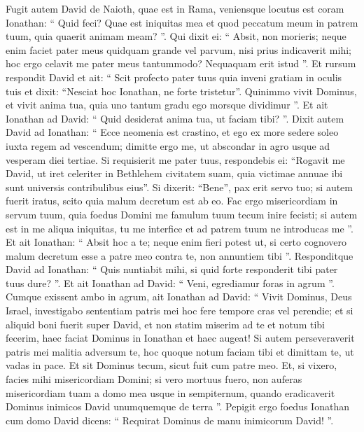 \begin{biblechapter}
\begin{biblechapter}
\begin{biblechapter}
\begin{biblechapter}
\begin{biblechapter}
\begin{biblechapter}
\begin{biblechapter}
\begin{biblechapter}
\begin{biblechapter}
\begin{biblechapter}
\begin{biblechapter}
\begin{biblechapter}
\begin{biblechapter}
\begin{biblechapter}
\begin{biblechapter}
\begin{biblechapter}
\begin{biblechapter}
\begin{biblechapter}
\begin{biblechapter}
\begin{biblechapter}
\verse Fugit autem David de Naioth, quae est in Rama, veniensque locutus est coram Ionathan: “ Quid feci? Quae est iniquitas mea et quod peccatum meum in patrem tuum, quia quaerit animam meam? ”. 
\verse Qui dixit ei: “ Absit, non morieris; neque enim faciet pater meus quidquam grande vel parvum, nisi prius indicaverit mihi; hoc ergo celavit me pater meus tantummodo? Nequaquam erit istud ”. 
\verse Et rursum respondit David et ait: “ Scit profecto pater tuus quia inveni gratiam in oculis tuis et dixit: “Nesciat hoc Ionathan, ne forte tristetur”. Quinimmo vivit Dominus, et vivit anima tua, quia uno tantum gradu ego morsque dividimur ”.
 \verse Et ait Ionathan ad David: “ Quid desiderat anima tua, ut faciam tibi? ”. 
\verse Dixit autem David ad Ionathan: “ Ecce neomenia est crastino, et ego ex more sedere soleo iuxta regem ad vescendum; dimitte ergo me, ut abscondar in agro usque ad vesperam diei tertiae. 
\verse Si requisierit me pater tuus, respondebis ei: “Rogavit me David, ut iret celeriter in Bethlehem civitatem suam, quia victimae annuae ibi sunt universis contribulibus eius”. 
\verse Si dixerit: “Bene”, pax erit servo tuo; si autem fuerit iratus, scito quia malum decretum est ab eo. 
\verse Fac ergo misericordiam in servum tuum, quia foedus Domini me famulum tuum tecum inire fecisti; si autem est in me aliqua iniquitas, tu me interfice et ad patrem tuum ne introducas me ”. 
\verse Et ait Ionathan: “ Absit hoc a te; neque enim fieri potest ut, si certo cognovero malum decretum esse a patre meo contra te, non annuntiem tibi ”. 
\verse Responditque David ad Ionathan: “ Quis nuntiabit mihi, si quid forte responderit tibi pater tuus dure? ”.
 \verse Et ait Ionathan ad David: “ Veni, egrediamur foras in agrum ”. Cumque exissent ambo in agrum, 
\verse ait Ionathan ad David: “ Vivit Dominus, Deus Israel, investigabo sententiam patris mei hoc fere tempore cras vel perendie; et si aliquid boni fuerit super David, et non statim miserim ad te et notum tibi fecerim, 
\verse haec faciat Dominus in Ionathan et haec augeat! Si autem perseveraverit patris mei malitia adversum te, hoc quoque notum faciam tibi et dimittam te, ut vadas in pace. Et sit Dominus tecum, sicut fuit cum patre meo. 
\verse Et, si vixero, facies mihi misericordiam Domini; si vero mortuus fuero, 
 \verse non auferas misericordiam tuam a domo mea usque in sempiternum, quando eradicaverit Dominus inimicos David unumquemque de terra ”. 
\verse Pepigit ergo foedus Ionathan cum domo David dicens: “ Requirat Dominus de manu inimicorum David! ”. 

\end{biblechapter}
\end{biblechapter}
\end{biblechapter}
\end{biblechapter}
\end{biblechapter}
\end{biblechapter}
\end{biblechapter}
\end{biblechapter}
\end{biblechapter}
\end{biblechapter}
\end{biblechapter}
\end{biblechapter}
\end{biblechapter}
\end{biblechapter}
\end{biblechapter}
\end{biblechapter}
\end{biblechapter}
\end{biblechapter}
\end{biblechapter}
\end{biblechapter}
